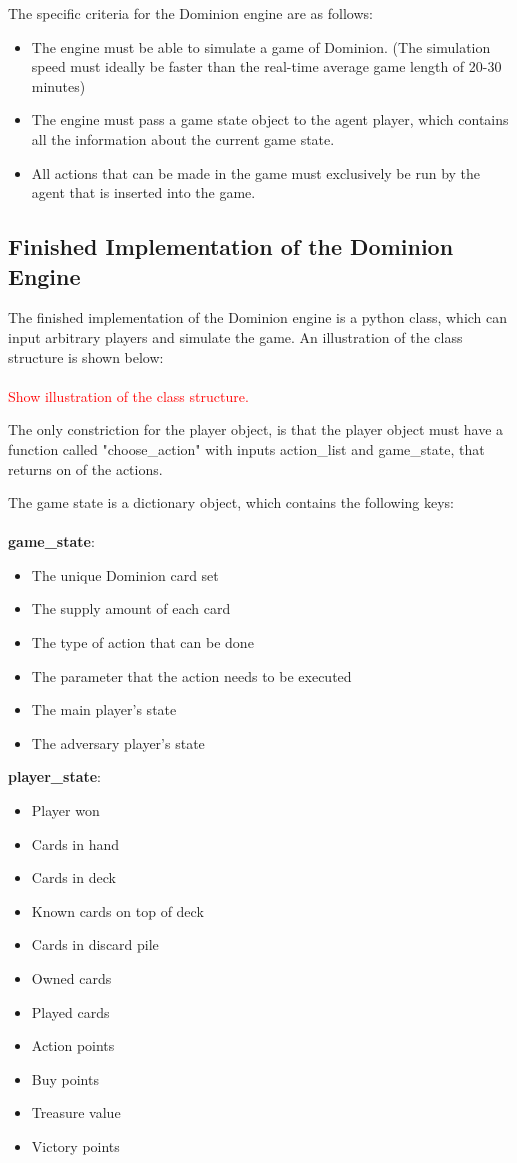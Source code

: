 The specific criteria for the Dominion engine are as follows:

\begin{itemize}
    \item The engine must be able to simulate a game of Dominion. (The simulation speed must ideally be faster than the real-time average game length of 20-30 minutes)
    \item The engine must pass a game state object to the agent player, which contains all the information about the current game state.
    \item All actions that can be made in the game must exclusively be run by the agent that is inserted into the game.
\end{itemize}

\subsection{Finished Implementation of the Dominion Engine} \label{sec:engine_implementation}
The finished implementation of the Dominion engine is a python class, which can input arbitrary players and simulate the game. An illustration of the class structure is shown below:\\\\
\textcolor{red}{Show illustration of the class structure.}

The only constriction for the player object, is that the player object must have a function called "choose\_action" with inputs action\_list and game\_state, that returns on of the actions.

The game state is a dictionary object, which contains the following keys:\\\\
\textbf{game\_state}:
\begin{itemize}
    \item The unique Dominion card set
    \item The supply amount of each card
    \item The type of action that can be done
    \item The parameter that the action needs to be executed
    \item The main player's state
    \item The adversary player's state
\end{itemize}

\textbf{player\_state}:
\begin{itemize}
    \item Player won
    \item Cards in hand
    \item Cards in deck
    \item Known cards on top of deck
    \item Cards in discard pile
    \item Owned cards
    \item Played cards
    \item Action points
    \item Buy points
    \item Treasure value
    \item Victory points
\end{itemize}

